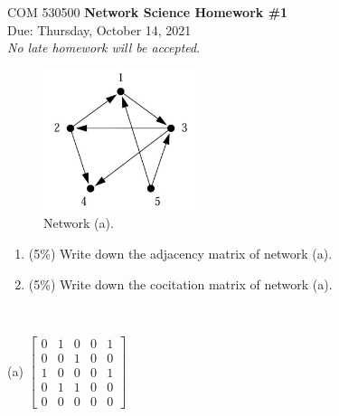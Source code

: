 \documentclass[12pt]{article}
\newcommand {\bsolution}{\noindent {\em Solution:} \ }
\begin{document}
\thispagestyle{empty}
\begin{center}
{\Large \noindent COM 530500 {\bf Network Science Homework \#1} \\
\large {{\sc Due:} Thursday, October 14, 2021}  \\
}
\emph{No late homework will be accepted}.
\end{center}





\bigskip

\begin{figure}[h]
	\centering
	\includegraphics[width=0.4\textwidth]{NS_Hw1_a.jpg}
	\caption{Network (a).}
	\label{NS_Hw1_a}
\end{figure}

\begin{enumerate}[label=(\alph*)]
	\item (5\%) Write down the adjacency matrix of network (a).
	\item (5\%) Write down the cocitation matrix of network (a).
\end{enumerate}

\bsolution

(a) $\begin{bmatrix}
	0 & 1 & 0 & 0 & 1 \\
	0 & 0 & 1 & 0 & 0 \\
	1 & 0 & 0 & 0 & 1 \\
	0 & 1 & 1 & 0 & 0 \\
	0 & 0 & 0 & 0 & 0 
	\end{bmatrix}$
\end{document}
